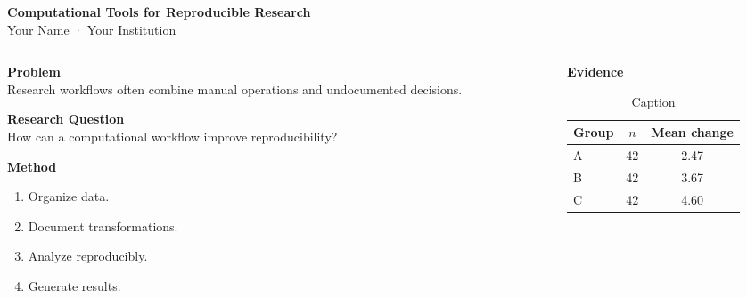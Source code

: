 \documentclass[final]{beamer}
\begin{document}
\begin{frame}[t]
\begin{center}
{\Huge\bfseries Computational Tools for Reproducible Research}\\[.4cm]
{\Large Your Name · Your Institution}\\[4cm]    
\end{center}

\begin{columns}[t,totalwidth=\textwidth]

    \begin{column}{.31\textwidth}
    {\LARGE\bfseries Problem}\\[.3cm]
    Research workflows often combine manual operations and undocumented decisions.
\vspace{10cm}

    {\LARGE\bfseries Research Question}\\[.3cm]
    How can a computational workflow improve reproducibility?
    \vspace{.8cm}


    {\LARGE\bfseries Method}\\[.3cm]
    \begin{enumerate}
        \item Organize data.
        \item Document transformations.
        \item Analyze reproducibly.
        \item Generate results.
    \end{enumerate}
    \lipsum[1-4]
\end{column}

\begin{column}{.03\textwidth}
\end{column}

\begin{column}{.31\textwidth}
{\LARGE\bfseries Evidence}\\[.3cm]
\begin{center}
\end{center}
\lipsum[1-4]
\begin{table}[ht]\centering
\begin{tabular}{lcc}
    \toprule Group&$n$&Mean change\\
    \midrule 
    A&42&2.47\\
    B&42&3.67\\
    C&42&4.60\\
\bottomrule\end{tabular}
\caption{Caption \label{tab:placeholder}}
\end{table}


\end{column}
\end{columns}
\end{frame}
\end{document}
